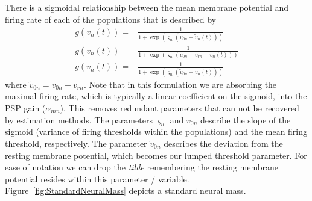 \documentclass[]{article}
\begin{document}
There is a sigmoidal relationship between the mean membrane potential and firing rate of each of the populations that is described by 
\begin{align}
	g\left(\tilde v_n(t)\right) =& \frac{1}{1+\exp{\left(\varsigma_n\left(v_{0n}-\tilde v_n(t)\right)\right)}} \\
	g\left(\tilde v_n(t)\right) =& \frac{1}{1+\exp{\left(\varsigma_n\left(v_{0n}+v_{rn}-v_n(t)\right)\right)}} \\
	g\left(v_n(t)\right) =& \frac{1}{1+\exp{\left(\varsigma_n\left(\tilde v_{0n}-v_n(t)\right)\right)}}
\end{align}
where $\tilde v_{0n} = v_{0n} + v_{rn}$. Note that in this formulation we are absorbing the maximal firing rate, which is typically a linear coefficient on the sigmoid, into the PSP gain ($\alpha_{mn}$). This removes redundant parameters that can not be recovered by estimation methods. The parameters $\varsigma_n$ and $v_{0n}$ describe the slope of the sigmoid (variance of firing thresholds within the populations) and the mean firing threshold, respectively. The parameter $\tilde v_{0n}$ describes the deviation from the resting membrane potential, which becomes our lumped threshold parameter. For ease of notation we can drop the \emph{tilde} remembering the resting membrane potential resides within this parameter / variable. Figure~\ref{fig:StandardNeuralMass} depicts a standard neural mass.
\end{document}
